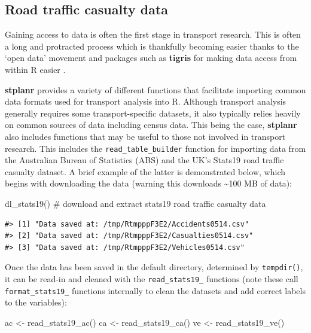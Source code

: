 \subsection{Road traffic casualty data}\label{accessing-and-processing-transport-data}

Gaining access to data is often the first stage in transport research.
This is often a long and protracted process which is thankfully becoming
easier thanks to the `open data' movement and packages such as
\textbf{tigris} for making data access from within R easier
\citep{walker_tigris:_2016}.

\textbf{stplanr} provides a variety of different functions that
facilitate importing common data formats used for transport analysis
into R. Although transport analysis generally requires some
transport-specific datasets, it also typically relies heavily on common
sources of data including census data. This being the case,
\textbf{stplanr} also includes functions that may be useful to those not
involved in transport research. This includes the
\texttt{read\_table\_builder} function for importing data from the
Australian Bureau of Statistics (ABS) and the UK's Stats19 road traffic
casualty dataset. A brief example of the latter is demonstrated below,
which begins with downloading the data (warning this downloads
\textasciitilde{}100 MB of data):

\begin{Schunk}
\begin{Sinput}
dl_stats19() # download and extract stats19 road traffic casualty data
\end{Sinput}
\end{Schunk}

\begin{verbatim}
#> [1] "Data saved at: /tmp/RtmpppF3E2/Accidents0514.csv"
#> [2] "Data saved at: /tmp/RtmpppF3E2/Casualties0514.csv"
#> [3] "Data saved at: /tmp/RtmpppF3E2/Vehicles0514.csv"
\end{verbatim}

Once the data has been saved in the default directory, determined by
\texttt{tempdir()}, it can be read-in and cleaned with the
\texttt{read\_stats19\_} functions (note these call
\texttt{format\_stats19\_} functions internally to clean the datasets
and add correct labels to the variables):

\begin{Schunk}
\begin{Sinput}
ac <- read_stats19_ac()
ca <- read_stats19_ca()
ve <- read_stats19_ve()
\end{Sinput}
\end{Schunk}

